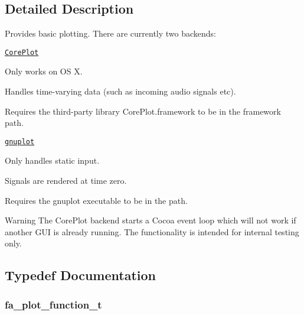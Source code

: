 \subsection{Detailed Description}
Provides basic plotting. There are currently two backends\-:


\begin{DoxyItemize}
\item \href{http://code.google.com/p/core-plot/}{\tt Core\-Plot}
\begin{DoxyItemize}
\item Only works on O\-S X.
\item Handles time-\/varying data (such as incoming audio signals etc).
\item Requires the third-\/party library {\ttfamily Core\-Plot.\-framework} to be in the framework path.
\end{DoxyItemize}
\item \href{http://gnuplot.sourceforge.net/}{\tt gnuplot}
\begin{DoxyItemize}
\item Only handles static input.
\item Signals are rendered at time zero.
\item Requires the {\ttfamily gnuplot} executable to be in the path.
\end{DoxyItemize}
\end{DoxyItemize}

\begin{DoxyWarning}{Warning}
The Core\-Plot backend starts a Cocoa event loop which will not work if another G\-U\-I is already running. The functionality is intended for internal testing only. 
\end{DoxyWarning}


\subsection{Typedef Documentation}
\hypertarget{group___fa_plot_ga6c91e512a0be9ba8332e0023697c8c8f}{
\subsubsection[{fa\-\_\-plot\-\_\-function\-\_\-t}]{\setlength{\rightskip}{0pt plus 5cm}fa\-\_\-plot\-\_\-function\-\_\-t}}\label{group___fa_plot_ga6c91e512a0be9ba8332e0023697c8c8f}


